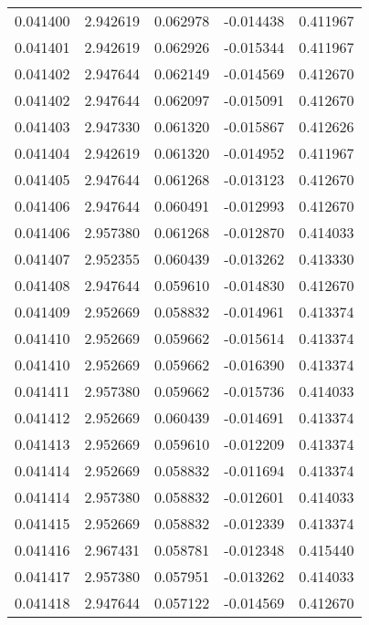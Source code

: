 \begin{tabular}{lrrrr}
0.041400    &  2.942619 &  0.062978 & -0.014438 &             0.411967 \\
0.041401    &  2.942619 &  0.062926 & -0.015344 &             0.411967 \\
0.041402    &  2.947644 &  0.062149 & -0.014569 &             0.412670 \\
0.041402    &  2.947644 &  0.062097 & -0.015091 &             0.412670 \\
0.041403    &  2.947330 &  0.061320 & -0.015867 &             0.412626 \\
0.041404    &  2.942619 &  0.061320 & -0.014952 &             0.411967 \\
0.041405    &  2.947644 &  0.061268 & -0.013123 &             0.412670 \\
0.041406    &  2.947644 &  0.060491 & -0.012993 &             0.412670 \\
0.041406    &  2.957380 &  0.061268 & -0.012870 &             0.414033 \\
0.041407    &  2.952355 &  0.060439 & -0.013262 &             0.413330 \\
0.041408    &  2.947644 &  0.059610 & -0.014830 &             0.412670 \\
0.041409    &  2.952669 &  0.058832 & -0.014961 &             0.413374 \\
0.041410    &  2.952669 &  0.059662 & -0.015614 &             0.413374 \\
0.041410    &  2.952669 &  0.059662 & -0.016390 &             0.413374 \\
0.041411    &  2.957380 &  0.059662 & -0.015736 &             0.414033 \\
0.041412    &  2.952669 &  0.060439 & -0.014691 &             0.413374 \\
0.041413    &  2.952669 &  0.059610 & -0.012209 &             0.413374 \\
0.041414    &  2.952669 &  0.058832 & -0.011694 &             0.413374 \\
0.041414    &  2.957380 &  0.058832 & -0.012601 &             0.414033 \\
0.041415    &  2.952669 &  0.058832 & -0.012339 &             0.413374 \\
0.041416    &  2.967431 &  0.058781 & -0.012348 &             0.415440 \\
0.041417    &  2.957380 &  0.057951 & -0.013262 &             0.414033 \\
0.041418    &  2.947644 &  0.057122 & -0.014569 &             0.412670 \\

\end{tabular}
